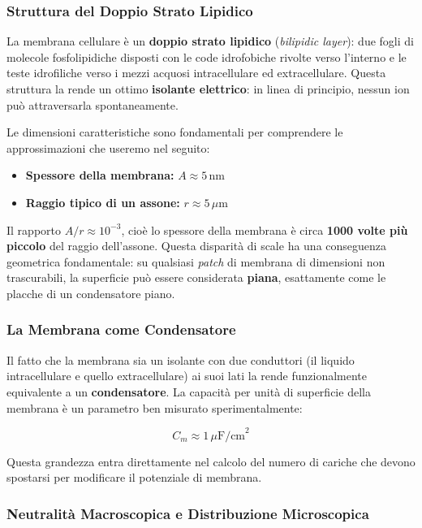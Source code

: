\subsubsection{Struttura del Doppio Strato Lipidico}

La membrana cellulare è un \textbf{doppio strato lipidico} (\textit{bilipidic layer}): due fogli di molecole fosfolipidiche disposti con le code idrofobiche rivolte verso l'interno e le teste idrofiliche verso i mezzi acquosi intracellulare ed extracellulare. Questa struttura la rende un ottimo \textbf{isolante elettrico}: in linea di principio, nessun ion può attraversarla spontaneamente.

Le dimensioni caratteristiche sono fondamentali per comprendere le approssimazioni che useremo nel seguito:

\begin{itemize}
    \item \textbf{Spessore della membrana:} $A \approx 5\,\text{nm}$
    \item \textbf{Raggio tipico di un assone:} $r \approx 5\,\mu\text{m}$
\end{itemize}

Il rapporto $A/r \approx 10^{-3}$, cioè lo spessore della membrana è circa \textbf{1000 volte più piccolo} del raggio dell'assone. Questa disparità di scale ha una conseguenza geometrica fondamentale: su qualsiasi \textit{patch} di membrana di dimensioni non trascurabili, la superficie può essere considerata \textbf{piana}, esattamente come le placche di un condensatore piano.

\subsubsection{La Membrana come Condensatore}

Il fatto che la membrana sia un isolante con due conduttori (il liquido intracellulare e quello extracellulare) ai suoi lati la rende funzionalmente equivalente a un \textbf{condensatore}. La capacità per unità di superficie della membrana è un parametro ben misurato sperimentalmente:

\begin{equation}
C_m \approx 1\,\mu\text{F/cm}^2
\end{equation}

Questa grandezza entra direttamente nel calcolo del numero di cariche che devono spostarsi per modificare il potenziale di membrana.

\subsubsection{Neutralità Macroscopica e Distribuzione Microscopica}

